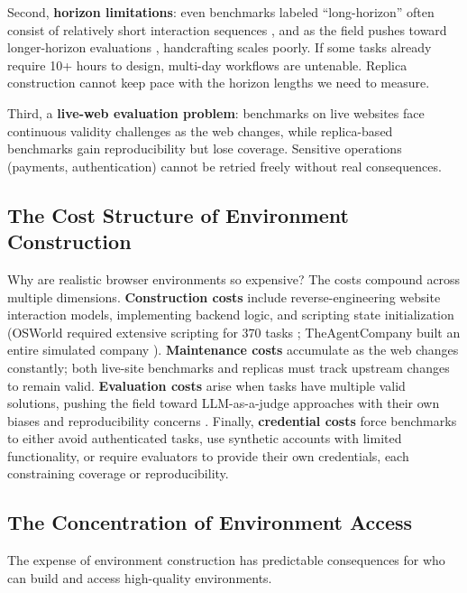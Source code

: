 \documentclass[letterpaper]{article}
\begin{document}
Second, \textbf{horizon limitations}: even benchmarks labeled ``long-horizon'' often consist of relatively short interaction sequences \citep{li2025mind2web2}, and as the field pushes toward longer-horizon evaluations \citep{metr2025}, handcrafting scales poorly. If some tasks already require 10+ hours to design, multi-day workflows are untenable. Replica construction cannot keep pace with the horizon lengths we need to measure.

Third, a \textbf{live-web evaluation problem}: benchmarks on live websites \citep{zhang2023mind2web, wei2025browsecomp, song2025bearcubs, he2024webvoyager} face continuous validity challenges as the web changes, while replica-based benchmarks \citep{zhou2023webarena, garg2025real} gain reproducibility but lose coverage. Sensitive operations (payments, authentication) cannot be retried freely without real consequences.

\subsection{The Cost Structure of Environment Construction}

Why are realistic browser environments so expensive? The costs compound across multiple dimensions. \textbf{Construction costs} include reverse-engineering website interaction models, implementing backend logic, and scripting state initialization (OSWorld required extensive scripting for 370 tasks \citep{xie2024osworld}; TheAgentCompany built an entire simulated company \citep{xu2024theagentcompany}). \textbf{Maintenance costs} accumulate as the web changes constantly; both live-site benchmarks and replicas must track upstream changes to remain valid. \textbf{Evaluation costs} arise when tasks have multiple valid solutions, pushing the field toward LLM-as-a-judge approaches with their own biases and reproducibility concerns \citep{xue2025illusion}. Finally, \textbf{credential costs} force benchmarks to either avoid authenticated tasks, use synthetic accounts with limited functionality, or require evaluators to provide their own credentials, each constraining coverage or reproducibility.

\subsection{The Concentration of Environment Access}

The expense of environment construction has predictable consequences for who can build and access high-quality environments.
\end{document}
